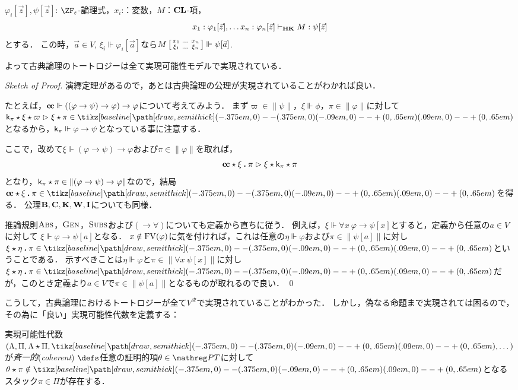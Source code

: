 \documentclass[realisability.tex]{subfiles}
\begin{document}
\begin{lemma}
 $\varphi_i[\vec{z}], \psi[\vec{z}]$: $\ZF_\varepsilon$-論理式，$x_i$:：変数，$M$：$\mathord{\mathbf{CL}}$-項，
 \[
  x_1 : \varphi_1[\vec{z}], \dots x_n : \varphi_n[\vec{z}] \vdash_{\mathord{\mathbf{HK}}} M: \psi[\vec{z}]
 \]
 とする．
 この時，$\vec{a} \in V$, $\xi_i \Vdash \varphi_i[\vec{a}]$なら$M\left[\begin{smallmatrix}x_1 & \dots & x_n\\\xi_1 & \dots & \xi_n\end{smallmatrix}\right] \Vdash \psi[\vec{a}]$.

 よって古典論理のトートロジーは全て実現可能性モデルで実現されている．
\end{lemma}
\begin{proof}[Sketch of Proof]
 演繹定理があるので，あとは古典論理の公理が実現されていることがわかれば良い．

 たとえば，$\mathsf{\mathbf{c\hspace{-1pt}c}} \Vdash ((\varphi \to \psi) \to \varphi) \to \varphi$について考えてみよう．
 まず$\varpi \in \|\psi\|$，$\xi \Vdash \phi$，$\pi \in \|\varphi\|$に対して$\conti_\pi \cons \xi \cons \varpi \reds \xi \cons \pi \in \pole$となるから，$\mathsf{k}_\pi \Vdash \varphi \to \psi$となっている事に注意する．

 ここで，改めて$\xi \Vdash (\varphi \to \psi) \to \varphi$および$\pi \in \|\varphi\|$を取れば，
 \[
  \mathsf{\mathbf{c\hspace{-1pt}c}} \mathbin{\star} \xi \mathbin{\boldsymbol{.}} \pi
 \mathrel{\rhd} \xi \mathbin{\star} \mathsf{k}_\pi \mathbin{\star} \pi
 \]
 となり，$\mathsf{k}_\pi \mathbin{\star} \pi \in \|(\varphi \to \psi) \to \varphi\|$なので，結局$\cc \cons \xi \push \pi \in \pole$を得る．
 公理$\mathsf{\mathbf{B}}, \mathsf{\mathbf{C}}, \mathsf{\mathbf{K}}, \mathsf{\mathbf{W}}, \mathsf{\mathbf{I}}$についても同様．

 推論規則$\mathord{\textsc{Abs}}$，$\mathord{\textsc{Gen}}$，$\mathord{\textsc{Subs}}$および$({\rightarrow}{\forall})$についても定義から直ちに従う．
 例えば，$\xi \Vdash \forall x \: \varphi \to \psi[x]$とすると，定義から任意の$a \in V$に対して
 $\xi \Vdash \varphi \to \psi[a]$となる．
 $x \notin \operatorname{FV}(\varphi)$に気を付ければ，これは任意の$\eta \Vdash \varphi$および$\pi \in \|\psi[a]\|$に対し$\xi \cons \eta \push \pi \in \pole$ということである．
 示すべきことは$\eta \Vdash \varphi$と$\pi \in \|\forall x\: \psi[x]\|$に対し$\xi \cons \eta \push \pi \in \pole$だが，このとき定義より$a \in V$で$\pi \in \|\psi[a]\|$となるものが取れるので良い． \qed
\end{proof}

こうして，古典論理におけるトートロジーが全て$V^{\mathcal{R}}$で実現されていることがわかった．
しかし，偽なる命題まで実現されては困るので，その為に「良い」実現可能性代数を定義する：

\begin{definition}
 実現可能性代数$(\Lambda, \Pi, \Lambda \cons \Pi, \pole, \dots)$が\emph{斉一的}(\emph{coherent}) $\defs$任意の証明的項$\theta \in \PT$に対して$\theta \cons \pi \notin \pole$となるスタック$\pi \in \Pi$が存在する．
\end{definition}
\end{document}
